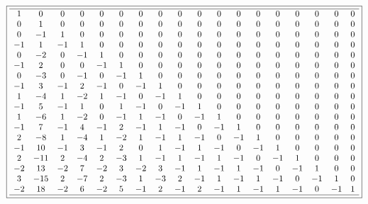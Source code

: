 \documentclass[10pt,reqno]{amsart}
\numberwithin{figure}{section}
\numberwithin{table}{section}
\theoremstyle{plain}
\numberwithin{theorem}{section}
\theoremstyle{remark}
\begin{document}
\begin{figure}[ht!]

\begin{minipage}{\linewidth} 
\begin{center} 
\tiny
\begin{equation*} 
\boxed{ 
\begin{array}{cccccccccccccccccc} \hline 
 1 & 0 & 0 & 0 & 0 & 0 & 0 & 0 & 0 & 0 & 0 & 0 & 0 & 0 & 0 & 0 & 0 & 0 \\
 0 & 1 & 0 & 0 & 0 & 0 & 0 & 0 & 0 & 0 & 0 & 0 & 0 & 0 & 0 & 0 & 0 & 0 \\
 0 & -1 & 1 & 0 & 0 & 0 & 0 & 0 & 0 & 0 & 0 & 0 & 0 & 0 & 0 & 0 & 0 & 0 \\
 -1 & 1 & -1 & 1 & 0 & 0 & 0 & 0 & 0 & 0 & 0 & 0 & 0 & 0 & 0 & 0 & 0 & 0 \\
 0 & -2 & 0 & -1 & 1 & 0 & 0 & 0 & 0 & 0 & 0 & 0 & 0 & 0 & 0 & 0 & 0 & 0 \\
 -1 & 2 & 0 & 0 & -1 & 1 & 0 & 0 & 0 & 0 & 0 & 0 & 0 & 0 & 0 & 0 & 0 & 0 \\
 0 & -3 & 0 & -1 & 0 & -1 & 1 & 0 & 0 & 0 & 0 & 0 & 0 & 0 & 0 & 0 & 0 & 0 \\
 -1 & 3 & -1 & 2 & -1 & 0 & -1 & 1 & 0 & 0 & 0 & 0 & 0 & 0 & 0 & 0 & 0 & 0 \\
 1 & -4 & 1 & -2 & 1 & -1 & 0 & -1 & 1 & 0 & 0 & 0 & 0 & 0 & 0 & 0 & 0 & 0 \\
 -1 & 5 & -1 & 1 & 0 & 1 & -1 & 0 & -1 & 1 & 0 & 0 & 0 & 0 & 0 & 0 & 0 & 0 \\
 1 & -6 & 1 & -2 & 0 & -1 & 1 & -1 & 0 & -1 & 1 & 0 & 0 & 0 & 0 & 0 & 0 & 0 \\
 -1 & 7 & -1 & 4 & -1 & 2 & -1 & 1 & -1 & 0 & -1 & 1 & 0 & 0 & 0 & 0 & 0 & 0 \\
 2 & -8 & 1 & -4 & 1 & -2 & 1 & -1 & 1 & -1 & 0 & -1 & 1 & 0 & 0 & 0 & 0 & 0 \\
 -1 & 10 & -1 & 3 & -1 & 2 & 0 & 1 & -1 & 1 & -1 & 0 & -1 & 1 & 0 & 0 & 0 & 0 \\
 2 & -11 & 2 & -4 & 2 & -3 & 1 & -1 & 1 & -1 & 1 & -1 & 0 & -1 & 1 & 0 & 0 & 0 \\
 -2 & 13 & -2 & 7 & -2 & 3 & -2 & 3 & -1 & 1 & -1 & 1 & -1 & 0 & -1 & 1 & 0 & 0 \\
 3 & -15 & 2 & -7 & 2 & -3 & 1 & -3 & 2 & -1 & 1 & -1 & 1 & -1 & 0 & -1 & 1 & 0 \\
 -2 & 18 & -2 & 6 & -2 & 5 & -1 & 2 & -1 & 2 & -1 & 1 & -1 & 1 & -1 & 0 & -1 & 1 \\
 \hline
\end{array}
}
\end{equation*}
\end{center} 
\end{minipage} 


\end{figure}
\end{document}
